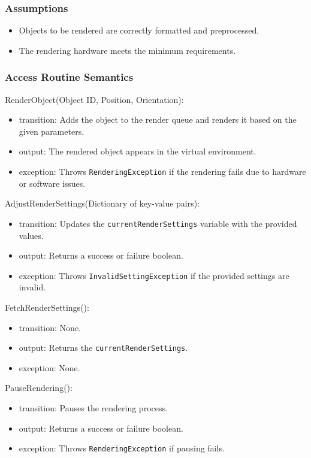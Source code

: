 \documentclass[12pt, titlepage]{article}
\begin{document}
\subsubsection{Assumptions}

\begin{itemize}
  \item Objects to be rendered are correctly formatted and preprocessed.
  \item The rendering hardware meets the minimum requirements.
\end{itemize}

\subsubsection{Access Routine Semantics}

\noindent RenderObject(Object ID, Position, Orientation):
\begin{itemize}
  \item transition: Adds the object to the render queue and renders it based on the given parameters.
  \item output: The rendered object appears in the virtual environment.
  \item exception: Throws \texttt{RenderingException} if the rendering fails due to hardware or software issues.
\end{itemize}

\noindent AdjustRenderSettings(Dictionary of key-value pairs):
\begin{itemize}
  \item transition: Updates the \texttt{currentRenderSettings} variable with the provided values.
  \item output: Returns a success or failure boolean.
  \item exception: Throws \texttt{InvalidSettingException} if the provided settings are invalid.
\end{itemize}

\noindent FetchRenderSettings():
\begin{itemize}
  \item transition: None.
  \item output: Returns the \texttt{currentRenderSettings}.
  \item exception: None.
\end{itemize}

\noindent PauseRendering():
\begin{itemize}
  \item transition: Pauses the rendering process.
  \item output: Returns a success or failure boolean.
  \item exception: Throws \texttt{RenderingException} if pausing fails.
\end{itemize}
\end{document}
